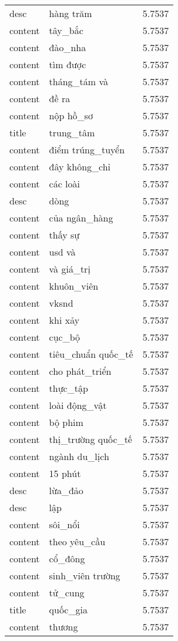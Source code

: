 \documentclass{article}
\begin{document}
\begin{tabular}{lll}
desc & hàng trăm & 5.7537\\
content & tây\_bắc & 5.7537\\
content & đào\_nha & 5.7537\\
content & tìm được & 5.7537\\
content & tháng\_tám và & 5.7537\\
content & đề ra & 5.7537\\
content & nộp hồ\_sơ & 5.7537\\
title & trung\_tâm & 5.7537\\
content & điểm trúng\_tuyển & 5.7537\\
content & đây không\_chỉ & 5.7537\\
content & các loài & 5.7537\\
desc & dòng & 5.7537\\
content & của ngân\_hàng & 5.7537\\
content & thấy sự & 5.7537\\
content & usd và & 5.7537\\
content & và giá\_trị & 5.7537\\
content & khuôn\_viên & 5.7537\\
content & vksnd & 5.7537\\
content & khi xảy & 5.7537\\
content & cục\_bộ & 5.7537\\
content & tiêu\_chuẩn quốc\_tế & 5.7537\\
content & cho phát\_triển & 5.7537\\
content & thực\_tập & 5.7537\\
content & loài động\_vật & 5.7537\\
content & bộ phim & 5.7537\\
content & thị\_trường quốc\_tế & 5.7537\\
content & ngành du\_lịch & 5.7537\\
content & 15 phút & 5.7537\\
desc & lừa\_đảo & 5.7537\\
desc & lập & 5.7537\\
content & sôi\_nổi & 5.7537\\
content & theo yêu\_cầu & 5.7537\\
content & cổ\_đông & 5.7537\\
content & sinh\_viên trường & 5.7537\\
content & tử\_cung & 5.7537\\
title & quốc\_gia & 5.7537\\
content & thương & 5.7537\\

\end{tabular}
\end{document}
